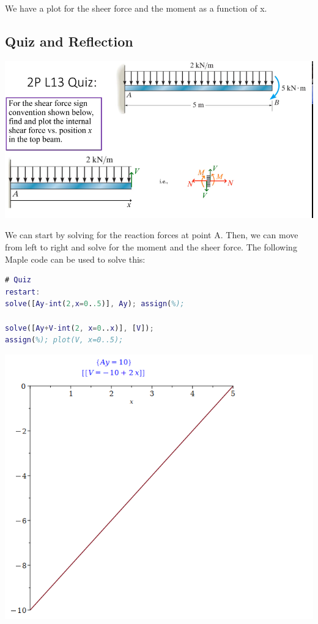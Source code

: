 \documentclass{article}[14pt, letterpaper, Times New Roman]
\begin{document}
We have a plot for the sheer force and the moment as a function of x.

\subsection{Quiz and Reflection}

\includegraphics[width=15cm]{l13-quiz.png}

We can start by solving for the reaction forces at point A.
Then, we can move from left to right and solve for the moment and the sheer force.
The following Maple code can be used to solve this:

\begin{lstlisting}[language=matlab]
# Quiz
restart:
solve([Ay-int(2,x=0..5)], Ay); assign(%);

solve([Ay+V-int(2, x=0..x)], [V]);
assign(%); plot(V, x=0..5);
\end{lstlisting}

\includegraphics[width=15cm]{l13-quiz-o.png}
\end{document}
